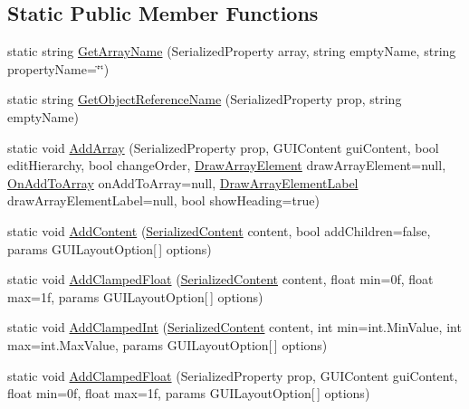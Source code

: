\subsection*{Static Public Member Functions}
\begin{DoxyCompactItemize}
\item 
static string \mbox{\hyperlink{class_root_motion_1_1_inspector_a3b89f376131fbdeec94074fe6759fffa}{Get\+Array\+Name}} (Serialized\+Property array, string empty\+Name, string property\+Name=\char`\"{}\char`\"{})
\item 
static string \mbox{\hyperlink{class_root_motion_1_1_inspector_ade26e9bd07d175f8a90415faf13997f5}{Get\+Object\+Reference\+Name}} (Serialized\+Property prop, string empty\+Name)
\item 
static void \mbox{\hyperlink{class_root_motion_1_1_inspector_abce58e13dd0ef29c1b0cf84b5332bd3c}{Add\+Array}} (Serialized\+Property prop, G\+U\+I\+Content gui\+Content, bool edit\+Hierarchy, bool change\+Order, \mbox{\hyperlink{class_root_motion_1_1_inspector_a369c57a74b02e7f38059b2bb5e7ef36c}{Draw\+Array\+Element}} draw\+Array\+Element=null, \mbox{\hyperlink{class_root_motion_1_1_inspector_a0d030b75017c7036643fb9d039ed39d7}{On\+Add\+To\+Array}} on\+Add\+To\+Array=null, \mbox{\hyperlink{class_root_motion_1_1_inspector_aa060038e590bda971023ece8f2945330}{Draw\+Array\+Element\+Label}} draw\+Array\+Element\+Label=null, bool show\+Heading=true)
\item 
static void \mbox{\hyperlink{class_root_motion_1_1_inspector_a7ef3d167347b2a99dc1797a709534339}{Add\+Content}} (\mbox{\hyperlink{struct_root_motion_1_1_serialized_content}{Serialized\+Content}} content, bool add\+Children=false, params G\+U\+I\+Layout\+Option\mbox{[}$\,$\mbox{]} options)
\item 
static void \mbox{\hyperlink{class_root_motion_1_1_inspector_a3048b6d957b237840e8e1f2c312db2a1}{Add\+Clamped\+Float}} (\mbox{\hyperlink{struct_root_motion_1_1_serialized_content}{Serialized\+Content}} content, float min=0f, float max=1f, params G\+U\+I\+Layout\+Option\mbox{[}$\,$\mbox{]} options)
\item 
static void \mbox{\hyperlink{class_root_motion_1_1_inspector_a3446ec18e22ca9f9a24292f5800487c5}{Add\+Clamped\+Int}} (\mbox{\hyperlink{struct_root_motion_1_1_serialized_content}{Serialized\+Content}} content, int min=int.\+Min\+Value, int max=int.\+Max\+Value, params G\+U\+I\+Layout\+Option\mbox{[}$\,$\mbox{]} options)
\item 
static void \mbox{\hyperlink{class_root_motion_1_1_inspector_ae3b8bee1b12a2d6801eecc66ed015b2a}{Add\+Clamped\+Float}} (Serialized\+Property prop, G\+U\+I\+Content gui\+Content, float min=0f, float max=1f, params G\+U\+I\+Layout\+Option\mbox{[}$\,$\mbox{]} options)

\end{DoxyCompactItemize}
